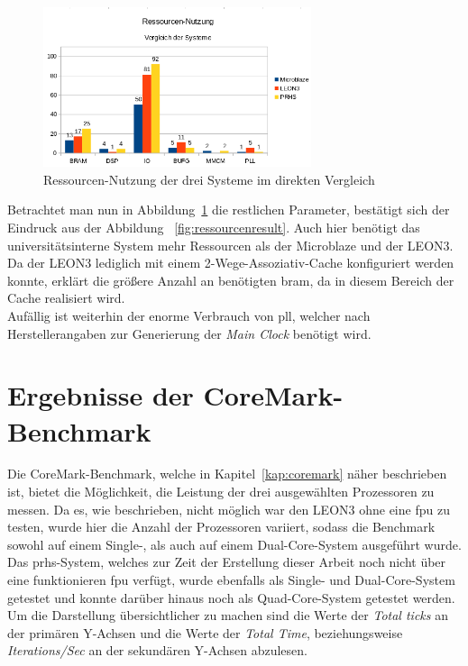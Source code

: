 \begin{figure}[H]
\centering
\includegraphics[width=0.7\textwidth]{Hauptteil/ressourcenresult1.png}
\caption{Ressourcen-Nutzung der drei Systeme im direkten Vergleich}
\label{fig:ressourcenresult1}
\end{figure}

Betrachtet man nun in Abbildung~\ref{fig:ressourcenresult1} die restlichen Parameter, bestätigt sich der Eindruck aus der Abbildung
~\ref{fig:ressourcenresult}. Auch hier benötigt das universitätsinterne System mehr Ressourcen als der Microblaze und der LEON3.
Da der LEON3 lediglich mit einem 2-Wege-Assoziativ-Cache konfiguriert werden konnte, erklärt die größere Anzahl an
benötigten \ac{bram}, da in diesem Bereich der Cache realisiert wird.\\
Aufällig ist weiterhin der enorme Verbrauch von \ac{pll}, welcher nach Herstellerangaben zur Generierung der \emph{Main Clock}
benötigt wird.\\

\newpage
\section{Ergebnisse der CoreMark-Benchmark}\label{kap:coremarktest}
Die CoreMark-Benchmark, welche in Kapitel~\ref{kap:coremark} näher beschrieben ist, bietet die Möglichkeit, die Leistung der drei ausgewählten Prozessoren zu messen. Da es, wie beschrieben,
nicht möglich war den LEON3 ohne eine \ac{fpu} zu testen, wurde hier die Anzahl der Prozessoren variiert, sodass die Benchmark sowohl auf einem Single-, als auch auf einem Dual-Core-System
ausgeführt wurde.\\
Das \ac{prhs}-System, welches zur Zeit der Erstellung dieser Arbeit noch nicht über eine funktionieren \ac{fpu} verfügt, wurde ebenfalls als Single- und Dual-Core-System getestet und konnte
darüber hinaus noch als Quad-Core-System getestet werden.\\
Um die Darstellung übersichtlicher zu machen sind die Werte der \emph{Total ticks} an der primären Y-Achsen und die Werte der \emph{Total Time}, beziehungsweise \emph{Iterations/Sec}
an der sekundären Y-Achsen abzulesen.\\

